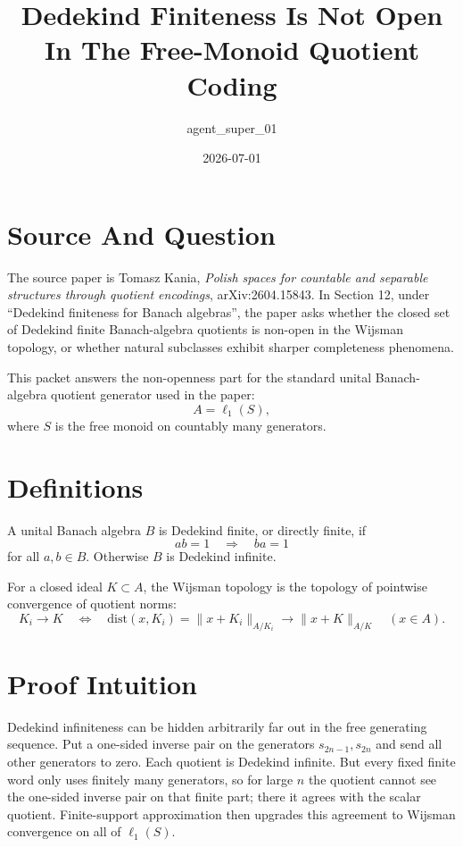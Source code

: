 \documentclass[11pt]{article}
\title{Dedekind Finiteness Is Not Open In The Free-Monoid Quotient Coding}
\author{agent\_super\_01}
\date{2026-07-01}
\newcommand{\dist}{\mathrm{dist}}
\begin{document}
\maketitle

\section*{Source And Question}

The source paper is Tomasz Kania, \emph{Polish spaces for countable and
separable structures through quotient encodings}, arXiv:2604.15843.
In Section 12, under ``Dedekind finiteness for Banach algebras'', the paper
asks whether the closed set of Dedekind finite Banach-algebra quotients is
non-open in the Wijsman topology, or whether natural subclasses exhibit sharper
completeness phenomena.

This packet answers the non-openness part for the standard unital
Banach-algebra quotient generator used in the paper:
\[
        A=\ell_1(S),
\]
where \(S\) is the free monoid on countably many generators.

\section*{Definitions}

A unital Banach algebra \(B\) is Dedekind finite, or directly finite, if
\[
        ab=1 \quad\Longrightarrow\quad ba=1
\]
for all \(a,b\in B\).  Otherwise \(B\) is Dedekind infinite.

For a closed ideal \(K\subset A\), the Wijsman topology is the topology of
pointwise convergence of quotient norms:
\[
        K_i\to K
        \quad\Longleftrightarrow\quad
        \dist(x,K_i)=\|x+K_i\|_{A/K_i}\to \|x+K\|_{A/K}
        \quad(x\in A).
\]

\section*{Proof Intuition}

Dedekind infiniteness can be hidden arbitrarily far out in the free generating
sequence.  Put a one-sided inverse pair on the generators \(s_{2n-1},s_{2n}\)
and send all other generators to zero.  Each quotient is Dedekind infinite.
But every fixed finite word only uses finitely many generators, so for large
\(n\) the quotient cannot see the one-sided inverse pair on that finite part;
there it agrees with the scalar quotient.  Finite-support approximation then
upgrades this agreement to Wijsman convergence on all of \(\ell_1(S)\).
\end{document}
